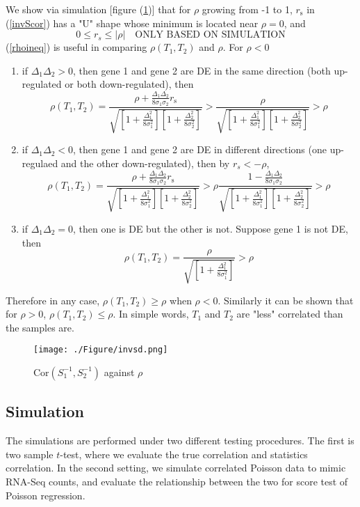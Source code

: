 \documentclass[12pt, a4paper]{article}
\begin{document}
	We show via simulation [figure (\ref{invsd})] that for $\rho$ growing from -1 to 1, $r_{\text{s}}$
	in (\ref{invScor}) has a "U" shape whose minimum is located near $\rho=0$, and  
	\begin{equation}\label{rhoineq}
		0 \leq r_s \leq |\rho| \text{~~ ONLY BASED ON SIMULATION}
	\end{equation}
	(\ref{rhoineq}) is useful in comparing  $\rho({T_1, T_2})$  and $\rho$. 
	For $\rho <0 $
	\begin{enumerate}
		\item if $\Delta_1\Delta_2 >0$, then gene 1 and gene 2 are DE in the same direction (both 
		up-regulated or both down-regulated), then 
		\[\rho(T_1, T_2)= \frac{\rho + \frac{\Delta_1\Delta_2}{8\sigma_1\sigma_2}r_{\text{s}}}{\sqrt{ 
				\left[ 1 + \frac{\Delta_1^2}{8\sigma_1^2}\right]\left[ 1 + \frac{\Delta_2^2}{8\sigma_2^2}\right]}} 
		>\frac{\rho }{\sqrt{  \left[ 1 + \frac{\Delta_1^2}{8\sigma_1^2}\right]\left[ 1 +
				\frac{\Delta_2^2}{8\sigma_2^2}\right]}} >\rho\]
		\item  if $\Delta_1\Delta_2 <0$, then gene 1 and gene 2 are DE in different directions (one
		up-regulaed and the other down-regulated), then by $r_s < -\rho$, 
		\[\rho(T_1, T_2)= \frac{\rho + \frac{\Delta_1\Delta_2}{8\sigma_1\sigma_2}r_{\text{s}}}{\sqrt{ 
				\left[ 1 + \frac{\Delta_1^2}{8\sigma_1^2}\right]\left[ 1 + \frac{\Delta_2^2}{8\sigma_2^2}\right]}} 
		>\rho\frac{ 1-\frac{\Delta_1\Delta_2}{8\sigma_1\sigma_2}}{\sqrt{  \left[ 1 +
				\frac{\Delta_1^2}{8\sigma_1^2}\right]\left[ 1 + \frac{\Delta_2^2}{8\sigma_2^2}\right]}} >\rho\]
		\item if  $\Delta_1\Delta_2 =0$, then one is DE but the other is not. Suppose gene 1 is not DE,
		then
		\[\rho(T_1, T_2)= \frac{\rho}{\sqrt{  \left[ 1 + \frac{\Delta_1^2}{8\sigma_1^2}\right]}} >\rho \]
		
	\end{enumerate}
	Therefore in any case, $\rho(T_1, T_2) \geq \rho$ when $\rho <0$. Similarly it can be shown that for
	$\rho >0$, $\rho(T_1, T_2) \leq \rho $. In simple words,  $T_1$ and $T_2$ are "less" correlated than
	the samples are. 
	\begin{figure}[!h]
		\centering
		\caption{$\text{Cor}(S^{-1}_1, S^{-1}_2)$ against $\rho$}
		\texttt{[image: ./Figure/invsd.png]}
		\label{invsd}
	\end{figure}
	
	
	
	\subsection{Simulation}
	The simulations are performed under two different testing procedures. The first is two sample
	$t$-test, where we evaluate the true correlation and statistics correlation.  In the second setting,
	we simulate correlated Poisson data to mimic RNA-Seq counts, and evaluate the relationship between
	the two for score test of Poisson regression. \\
	
\end{document}
